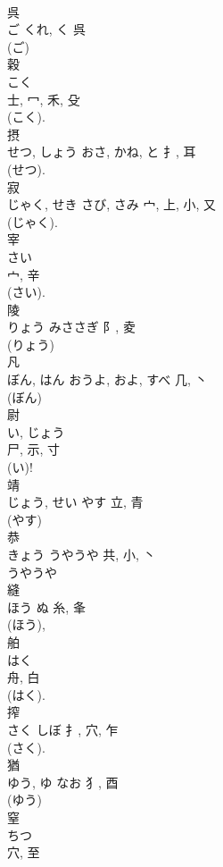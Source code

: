 \documentclass[8pt]{extreport}
\begin{document}
\begin{CJK}{UTF8}{min}
\\	呉	
\\	ご	くれ, く	呉	
\\	(ご) 
\\	穀	
\\	こく	
\\	士, 冖, 禾, 殳	
\\	(こく).	
\\	摂	
\\	せつ, しょう	おさ, かね, と	扌, 耳		
\\	(せつ). 
\\	寂	
\\	じゃく, せき	さび, さみ	宀, 上, 小, 又	
\\	(じゃく). 
\\	宰	
\\	さい	
\\	宀, 辛	
\\	(さい). 
\\	陵	
\\	りょう	みささぎ	阝, 夌	
\\	(りょう) 
\\	凡	
\\	ぼん, はん	おうよ, およ, すべ	几, 丶	
\\	(ぼん) 
\\	尉	
\\	い, じょう	
\\	尸, 示, 寸	
\\	(い)! 
\\	靖	
\\	じょう, せい	やす	立, 青	
\\	(やす)
\\	恭	
\\	きょう	うやうや	共, 小, 丶	
\\	うやうや 
\\	縫	
\\	ほう	ぬ	糸, 夆		
\\	(ほう), 
\\	舶	
\\	はく	
\\	舟, 白	
\\	(はく). 
\\	搾	
\\	さく	しぼ	扌, 穴, 乍	
\\	(さく). 
\\	猶	
\\	ゆう, ゆ	なお	犭, 酉		
\\	(ゆう) 
\\	窒	
\\	ちつ	
\\	穴, 至	

\end{CJK}
\end{document}
